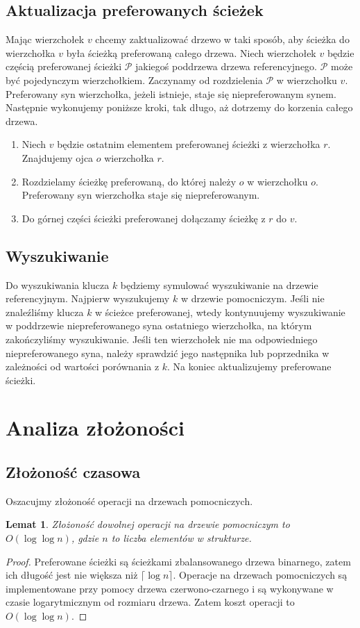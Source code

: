 \documentclass[declaration,shortabstract]{iithesis}
\newcounter{thm}[section]
\theoremstyle{thm}
\theoremstyle{remark}
\theoremstyle{plain}
\theoremstyle{plain}
\theoremstyle{plain}
\newtheorem{lemma}[thm]{Lemat}
\begin{document}
\subsection{Aktualizacja preferowanych ścieżek} Mając wierzchołek $v$ chcemy zaktualizować drzewo w taki sposób, aby ścieżka do wierzchołka $v$ była ścieżką preferowaną całego drzewa. Niech wierzchołek $v$ będzie częścią preferowanej ścieżki \(\mathcal{P}\) jakiegoś poddrzewa drzewa referencyjnego. \(\mathcal{P}\) może być pojedynczym wierzchołkiem. Zaczynamy od rozdzielenia \(\mathcal{P}\) w wierzchołku $v$. Preferowany syn wierzchołka, jeżeli istnieje, staje się niepreferowanym synem. Następnie wykonujemy poniższe kroki, tak długo, aż dotrzemy do korzenia całego drzewa. 
\begin{enumerate} 
\item{Niech $v$ będzie ostatnim elementem preferowanej ścieżki z wierzchołka $r$. Znajdujemy ojca $o$ wierzchołka $r$.} 
\item{Rozdzielamy ścieżkę preferowaną, do której należy $o$ w wierzchołku $o$. Preferowany syn wierzchołka staje się niepreferowanym.} 
\item{Do górnej części ścieżki preferowanej dołączamy ścieżkę z $r$ do $v$.} 
\end{enumerate} 
\subsection{Wyszukiwanie} Do wyszukiwania klucza $k$ będziemy symulować wyszukiwanie na drzewie referencyjnym. Najpierw wyszukujemy $k$ w drzewie pomocniczym. Jeśli nie znaleźliśmy klucza $k$ w ścieżce preferowanej, wtedy kontynuujemy wyszukiwanie w poddrzewie niepreferowanego syna ostatniego wierzchołka, na którym zakończyliśmy wyszukiwanie. Jeśli ten wierzchołek nie ma odpowiedniego niepreferowanego syna, należy sprawdzić jego następnika lub poprzednika w zależności od wartości porównania z $k$. Na koniec aktualizujemy preferowane ścieżki. 
\section{Analiza złożoności} 
\subsection{Złożoność czasowa} Oszacujmy złożoność operacji na drzewach pomocniczych. 
\begin{lemma} 
\label{Pref_cost} 
Złożoność dowolnej operacji na drzewie pomocniczym to \( O(\log \log n)\), gdzie $n$ to liczba elementów w strukturze. 
\end{lemma} 
\begin{proof} 
Preferowane ścieżki są ścieżkami zbalansowanego drzewa binarnego, zatem ich długość jest nie większa niż \(\lceil \log n \rceil\). Operacje na drzewach pomocniczych są implementowane przy pomocy drzewa czerwono-czarnego i są wykonywane w czasie logarytmicznym od rozmiaru drzewa. Zatem koszt operacji to \( O(\log\log n)\). 
\end{proof}  
\end{document}
